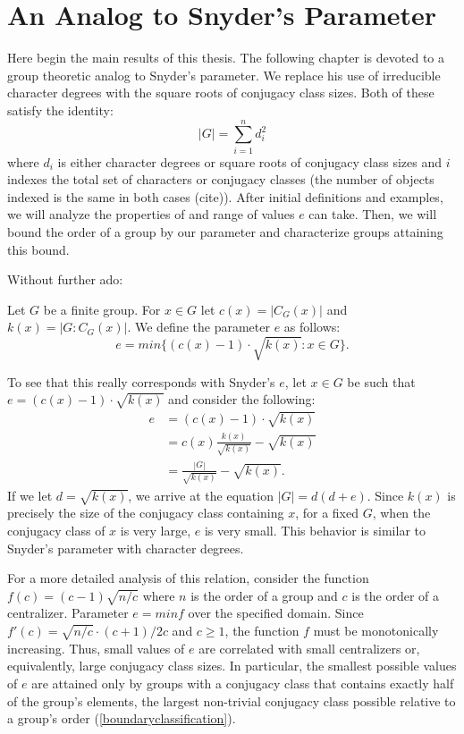 \documentclass[main.tex]{subfiles}
\begin{document}
\chapter{An Analog to Snyder's Parameter}

Here begin the main results of this thesis. The following chapter is devoted to a group theoretic analog to Snyder's parameter. We replace his use of irreducible character degrees with the square roots of conjugacy class sizes. Both of these satisfy the identity:
$$|G| = \sum_{i=1}^n d_i^2$$
where $d_i$ is either character degrees or square roots of conjugacy class sizes and $i$ indexes the total set of characters or conjugacy classes (the number of objects indexed is the same in both cases (cite)). After initial definitions and examples, we will analyze the properties of and range of values $e$ can take. Then, we will bound the order of a group by our parameter and characterize groups attaining this bound.

Without further ado:

\hss

\begin{definition}
Let $G$ be a finite group. For $x \in G$ let $c(x) = |C_G(x)|$ and $k(x) = |G : C_G(x)|$. We define the parameter $e$ as follows:
$$e = min\{(c(x) - 1) \cdot \sqrt{k(x)} : x \in G\}\text{.}$$
\end{definition}

\hss

To  see that this really corresponds with Snyder's $e$, let $x \in G$ be such that $e = (c(x) - 1) \cdot \sqrt{k(x)}$ and consider the following:
\begin{align*}
e &= (c(x) - 1) \cdot \sqrt{k(x)} \\
 &= c(x)\frac{k(x)}{\sqrt{k(x)}} - \sqrt{k(x)} \\
 &= \frac{|G|}{\sqrt{k(x)}} - \sqrt{k(x)}\text{.}
\end{align*}
If we let $d = \sqrt{k(x)}$, we arrive at the equation $|G| = d (d + e)$. Since $k(x)$ is precisely the size of the conjugacy class containing $x$, for a fixed $G$, when the conjugacy class of $x$ is very large, $e$ is very small. This behavior is similar to Snyder's parameter with character degrees. 

For a more detailed analysis of this relation, consider the function $f(c) = (c - 1) \sqrt{n/c}$ where $n$ is the order of a group and $c$ is the order of a centralizer. Parameter $e = min f$ over the specified domain. Since $f'(c) = \sqrt{n/c} \cdot (c+1) / 2c$ and $c \ge 1$, the function $f$ must be monotonically increasing. Thus, small values of $e$ are correlated with small centralizers or, equivalently, large conjugacy class sizes. In particular, the smallest possible values of $e$ are attained only by groups with a conjugacy class that contains exactly half of the group's elements, the largest non-trivial conjugacy class possible relative to a group's order (\ref{boundaryclassification}).
\end{document}
